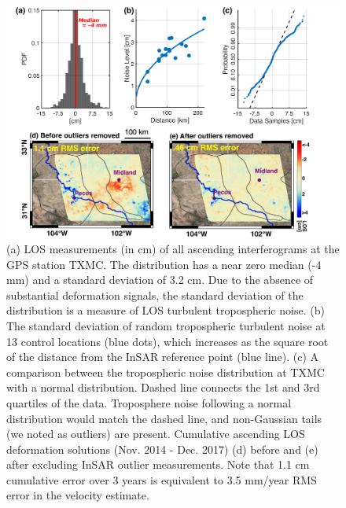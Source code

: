 \begin{figure}[hbt!]
	\centering
	\includegraphics[width=0.95\linewidth]{paper1-permian/figures/figure2-outlier-removal-5panel.pdf}
	\caption[Noise measurement and tropospheric outlier removal comparison]{(a) LOS measurements (in cm) of all ascending interferograms at the GPS station TXMC. The distribution has a near zero median (-4 mm) and a standard deviation of 3.2 cm. Due to the absence of substantial deformation signals, the standard deviation of the distribution is a measure of LOS turbulent tropospheric noise. (b) The standard deviation of random tropospheric turbulent noise at 13 control locations (blue dots), which increases as the square root of the distance from the InSAR reference point (blue line). (c) A comparison between the tropospheric noise distribution at TXMC with a normal distribution. Dashed line connects the 1st and 3rd quartiles of the data. Troposphere noise following a normal distribution would match the dashed line, and non-Gaussian tails (we noted as outliers) are present. Cumulative ascending LOS deformation solutions (Nov. 2014 - Dec. 2017) (d) before and (e) after excluding InSAR outlier measurements. Note that 1.1 cm cumulative error over 3 years is equivalent to 3.5 mm/year RMS error in the velocity estimate.}
	\label{fig:outliers}
\end{figure}


